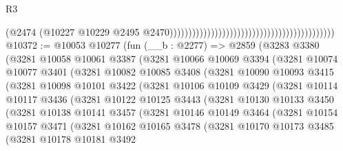 \begin{lexlean}{R3}
\begin{coremodule}
                                                                                        (@2474
                                                                                          (@10227
                                                                                            @10229
                                                                                            @2495
                                                                                            @2470))))))))))))))))))))))))))))))))))))))))))))
@10372 := @10053
    @10277
    (fun (__b : @2277) =>
    @2859
      (@3283
        @3380
        (@3281
          @10058
          @10061
          @3387
          (@3281
            @10066
            @10069
            @3394
            (@3281
              @10074
              @10077
              @3401
              (@3281
                @10082
                @10085
                @3408
                (@3281
                  @10090
                  @10093
                  @3415
                  (@3281
                    @10098
                    @10101
                    @3422
                    (@3281
                      @10106
                      @10109
                      @3429
                      (@3281
                        @10114
                        @10117
                        @3436
                        (@3281
                          @10122
                          @10125
                          @3443
                          (@3281
                            @10130
                            @10133
                            @3450
                            (@3281
                              @10138
                              @10141
                              @3457
                              (@3281
                                @10146
                                @10149
                                @3464
                                (@3281
                                  @10154
                                  @10157
                                  @3471
                                  (@3281
                                    @10162
                                    @10165
                                    @3478
                                    (@3281
                                      @10170
                                      @10173
                                      @3485
                                      (@3281
                                        @10178
                                        @10181
                                        @3492

\end{coremodule}
\end{lexlean}
